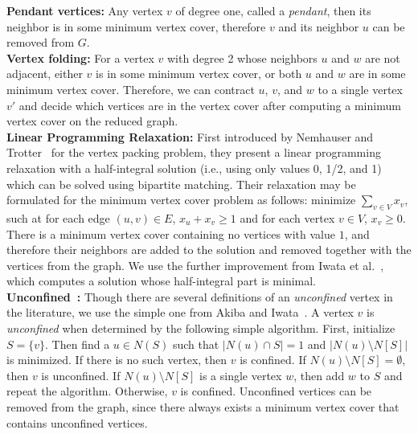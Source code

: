 \documentclass[twoside,leqno,twocolumn]{article}
\begin{document}
\noindent\textbf{Pendant vertices:} Any vertex $v$ of degree one, called a \emph{pendant}, then its neighbor is in some minimum vertex cover, therefore $v$ and its neighbor $u$ can be removed from $G$. \\


\noindent\textbf{Vertex folding:} For a vertex $v$ with degree 2 whose neighbors $u$ and $w$ are not adjacent, either $v$ is in some minimum vertex cover, or both $u$ and $w$ are in some minimum vertex cover. Therefore, we can contract $u$, $v$, and $w$ to a single vertex $v'$ and decide which vertices are in the vertex cover after computing a minimum vertex cover on the reduced graph. \\

\noindent\textbf{Linear Programming Relaxation:}
First introduced by Nemhauser and Trotter~\cite{nemhauser-1975} for the vertex packing problem, they present a linear programming relaxation with a half-integral solution (i.e., using only values 0, 1/2, and 1) which can be solved using bipartite matching. Their relaxation may be formulated for the minimum vertex cover problem as follows: minimize $\sum_{v\in V}{x_v}$, such at for each edge $(u, v) \in E$, $x_u + x_v \geq 1$ and for each vertex $v \in V$, $x_v \geq 0$. There is a minimum vertex cover containing no vertices with value $1$, and therefore their neighbors are added to the solution and removed together with the vertices from the graph. We use the further improvement from Iwata et al.~\cite{iwata-2014}, which computes a solution whose half-integral part is minimal. \\

\noindent\textbf{Unconfined~\cite{Xiao201392}:} Though there are several definitions of an \emph{unconfined} vertex in the literature, we use the simple one from Akiba and Iwata~\cite{akiba-tcs-2016}. A vertex $v$ is \emph{unconfined} when determined by the following simple algorithm. First, initialize $S = \{v\}$. Then find a $u \in N(S)$ such that $|N(u) \cap S| = 1$ and $|N(u) \setminus N[S]|$ is minimized. If there is no such vertex, then $v$ is confined. If $N(u) \setminus N[S] = \emptyset$, then $v$ is unconfined.  If $N(u)\setminus N[S]$ is a single vertex $w$, then add $w$ to $S$ and repeat the algorithm. Otherwise, $v$ is confined. Unconfined vertices can be removed from the graph, since there always exists a minimum vertex cover that contains unconfined vertices. \\
\end{document}
